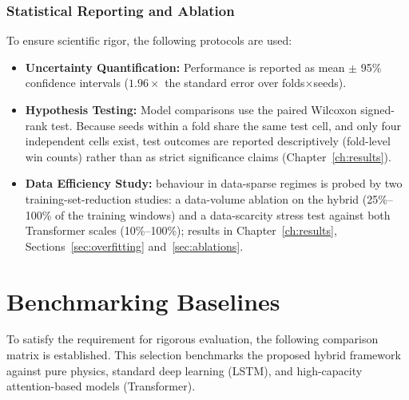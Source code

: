 \subsubsection{Statistical Reporting and Ablation}
To ensure scientific rigor, the following protocols are used:
\begin{itemize}
    \item \textbf{Uncertainty Quantification:} Performance is reported as mean $\pm$ 95\% confidence intervals ($1.96\times$ the standard error over folds$\times$seeds).
    \item \textbf{Hypothesis Testing:} Model comparisons use the paired Wilcoxon signed-rank test. Because seeds within a fold share the same test cell, and only four independent cells exist, test outcomes are reported descriptively (fold-level win counts) rather than as strict significance claims (Chapter~\ref{ch:results}).
    \item \textbf{Data Efficiency Study:} behaviour in data-sparse regimes is probed by two training-set-reduction studies: a data-volume ablation on the hybrid (25\%--100\% of the training windows) and a data-scarcity stress test against both Transformer scales (10\%--100\%); results in Chapter~\ref{ch:results}, Sections~\ref{sec:overfitting} and~\ref{sec:ablations}.
\end{itemize}

\section{Benchmarking Baselines}

To satisfy the requirement for rigorous evaluation, the following comparison matrix is established. This selection benchmarks the proposed hybrid framework against pure physics, standard deep learning (LSTM), and high-capacity attention-based models (Transformer).

